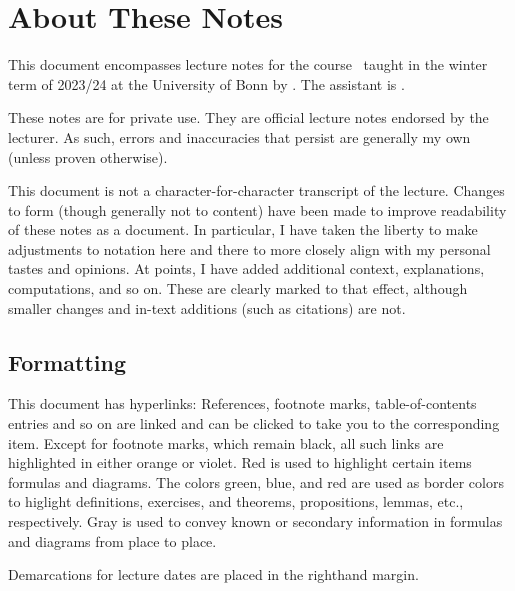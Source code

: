\documentclass[wip, topology]{bsteffan-lecturenotes}
\subtitle{The Serre Spectral Sequence, Characteristic Classes, and Bordism}
\author{Ben Steffan}
\begin{document}
\maketitle
\tableofcontents
\listoflectures

\setcounter{section}{-1}
\section*{About These Notes}
This document encompasses lecture notes for the course \makeatletter\@course\makeatother\ taught in the winter term of 2023/24 at the University of Bonn by \makeatletter\@lecturer\makeatother.
The assistant is \makeatletter\@assistant\makeatother.

These notes are for private use. 
They are  official lecture notes endorsed by the lecturer.
As such, errors and inaccuracies that persist are generally my own (unless proven otherwise).

This document is not a character-for-character transcript of the lecture.
Changes to form (though generally not to content) have been made to improve readability of these notes as a document.
In particular, I have taken the liberty to make adjustments to notation here and there to more closely align with my personal tastes and opinions.
At points, I have added additional context, explanations, computations, and so on.
These are clearly marked to that effect, although smaller changes and in-text additions (such as citations) are not.

\subsection*{Formatting}
This document has hyperlinks: References, footnote marks, table-of-contents entries and so on are linked and can be clicked to take you to the corresponding item.
Except for footnote marks, which remain black, all such links are highlighted in either \textcolor{linkcol}{orange} or \textcolor{citecol}{violet}. 
\textcolor{highlightcol}{Red} is used to highlight certain items formulas and diagrams.
The colors \textcolor{definitioncol}{green}, \textcolor{exercisecol}{blue}, and \textcolor{theoremcol}{red} are used as border colors to higlight definitions, exercises, and theorems, propositions, lemmas, etc., respectively.
\textcolor{knowngray}{Gray} is used to convey known or secondary information in formulas and diagrams from place to place.

Demarcations for lecture dates are placed in the righthand margin.
\end{document}
